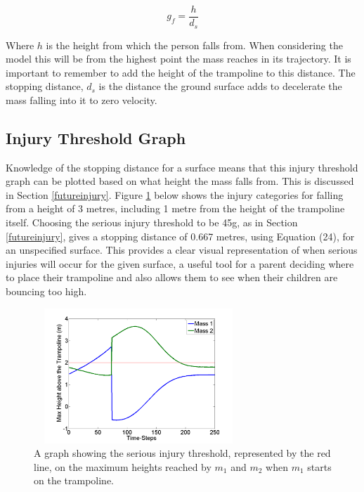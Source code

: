 \begin{equation}\label{gforce}
g_f=\frac{h}{d_s}
\end{equation}



\noindent Where $h$ is the height from which the person falls from. When considering the model this will be from the highest point the mass reaches in its trajectory. It is important to remember to add the height of the trampoline to this distance. The stopping distance, $d_s$ is the distance the ground surface adds to decelerate the mass falling into it to zero velocity.

\subsection{Injury Threshold Graph}

\noindent Knowledge of the stopping distance for a surface means that this injury threshold graph can be plotted based on what height the mass falls from. This is discussed in Section \ref{futureinjury}. Figure \ref{fig:inj} below shows the injury categories for falling from a height of 3 metres, including 1 metre from the height of the trampoline itself. Choosing the serious injury threshold to be 45g, as in Section \ref{futureinjury}, gives a stopping distance of 0.667 metres, using Equation (24), for an unspecified surface. This provides a clear visual representation of when serious injuries will occur for the given surface, a useful tool for a parent deciding where to place their trampoline and also allows them to see when their children are bouncing too high.

\begin{figure}[H]
	\centering
	\includegraphics[width=3.1in, height=2in]{injury.png}
    \caption{A graph showing the serious injury threshold, represented by the red line, on the maximum heights reached by $m_1$ and $m_2$ when $m_1$ starts on the trampoline.}\label{fig:inj}
\end{figure}




